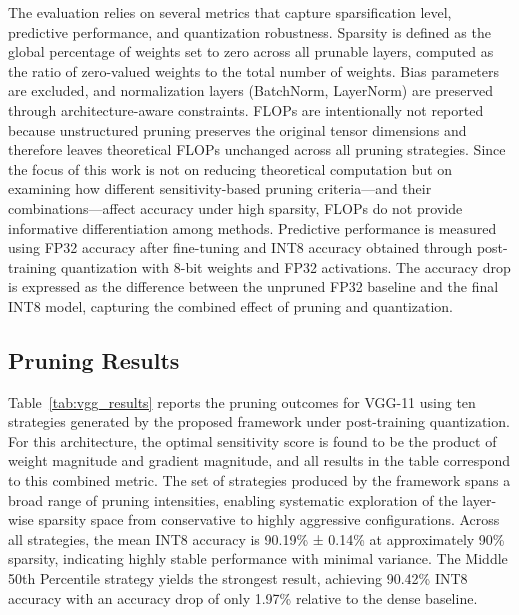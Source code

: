 \documentclass[11pt, conference]{IEEEtran}
\begin{document}
The evaluation relies on several metrics that capture sparsification level, predictive performance, and quantization robustness. Sparsity is defined as the global percentage of weights set to zero across all prunable layers, computed as the ratio of zero-valued weights to the total number of weights. Bias parameters are excluded, and normalization layers (BatchNorm, LayerNorm) are preserved through architecture-aware constraints. FLOPs are intentionally not reported because unstructured pruning preserves the original tensor dimensions and therefore leaves theoretical FLOPs unchanged across all pruning strategies. Since the focus of this work is not on reducing theoretical computation but on examining how different sensitivity-based pruning criteria—and their combinations—affect accuracy under high sparsity, FLOPs do not provide informative differentiation among methods. Predictive performance is measured using FP32 accuracy after fine-tuning and INT8 accuracy obtained through post-training quantization with 8-bit weights and FP32 activations. The accuracy drop is expressed as the difference between the unpruned FP32 baseline and the final INT8 model, capturing the combined effect of pruning and quantization.


\subsection{Pruning Results}

Table~\ref{tab:vgg_results} reports the pruning outcomes for VGG-11 using ten strategies generated by the proposed framework under post-training quantization. For this architecture, the optimal sensitivity score is found to be the product of weight magnitude and gradient magnitude, and all results in the table correspond to this combined metric. The set of strategies produced by the framework spans a broad range of pruning intensities, enabling systematic exploration of the layer-wise sparsity space from conservative to highly aggressive configurations. Across all strategies, the mean INT8 accuracy is 90.19\% ± 0.14\% at approximately 90\% sparsity, indicating highly stable performance with minimal variance. The Middle 50th Percentile strategy yields the strongest result, achieving 90.42\% INT8 accuracy with an accuracy drop of only 1.97\% relative to the dense baseline. 
\end{document}
